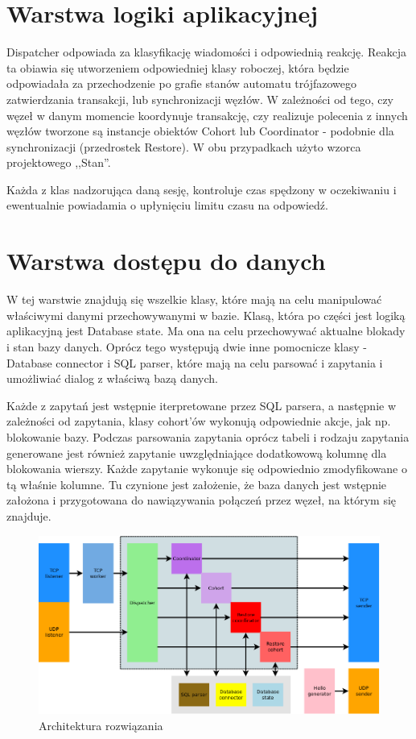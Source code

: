 \documentclass[a4paper, oneside, 11pt]{report}
\begin{document}
\section{Warstwa logiki aplikacyjnej}
Dispatcher odpowiada za klasyfikację wiadomości i odpowiednią reakcję. Reakcja ta obiawia się utworzeniem odpowiedniej klasy roboczej, która będzie odpowiadała za przechodzenie po grafie stanów automatu trójfazowego zatwierdzania transakcji, lub synchronizacji węzłów. W zależności od tego, czy węzeł w danym momencie koordynuje transakcję, czy realizuje polecenia z innych węzłów tworzone są instancje obiektów Cohort lub Coordinator - podobnie dla synchronizacji (przedrostek Restore). W obu przypadkach użyto wzorca projektowego ,,Stan''.

Każda z klas nadzorująca daną sesję, kontroluje czas spędzony w oczekiwaniu i ewentualnie powiadamia o upłynięciu limitu czasu na odpowiedź.

\section{Warstwa dostępu do danych}
W tej warstwie znajdują się wszelkie klasy, które mają na celu manipulować właściwymi danymi przechowywanymi w bazie. Klasą, która po części jest logiką aplikacyjną jest Database state. Ma ona na celu przechowywać aktualne blokady i stan bazy danych. Oprócz tego występują dwie inne pomocnicze klasy - Database connector i SQL parser, które mają na celu parsować i zapytania i umożliwiać dialog z właściwą bazą danych.

Każde z zapytań jest wstępnie iterpretowane przez SQL parsera, a następnie w zależności od zapytania, klasy cohort'ów wykonują odpowiednie akcje, jak np. blokowanie bazy. Podczas parsowania zapytania oprócz tabeli i rodzaju zapytania generowane jest również zapytanie uwzględniające dodatkowową kolumnę dla blokowania wierszy. Każde zapytanie wykonuje się odpowiednio zmodyfikowane o tą właśnie kolumne. Tu czynione jest założenie, że baza danych jest wstępnie założona i przygotowana do nawiązywania połączeń przez węzeł, na którym się znajduje.
\begin{figure}[h]
\centering
\includegraphics[width=22cm,angle=90]{architektura.png}
\caption{Architektura rozwiązania}
\end{figure}
\pagebreak
\end{document}
